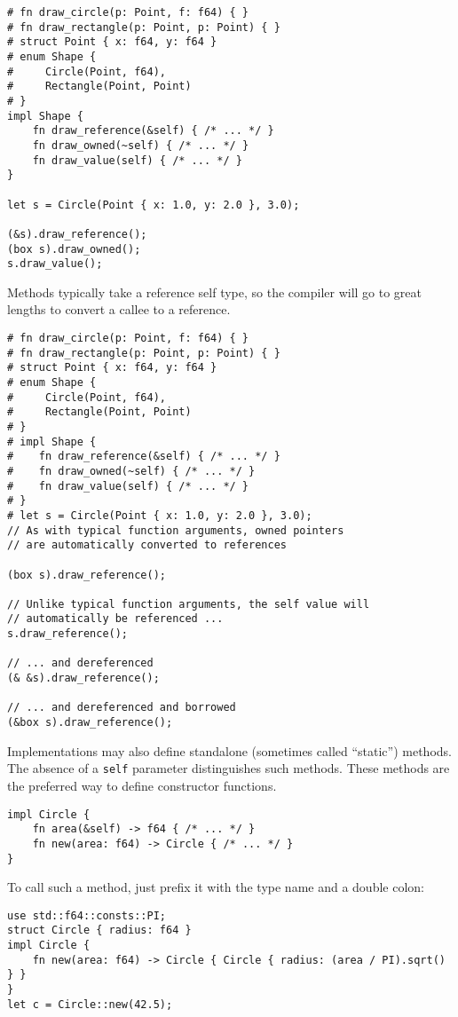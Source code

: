 \documentclass[]{article}
\begin{document}
\begin{verbatim}
# fn draw_circle(p: Point, f: f64) { }
# fn draw_rectangle(p: Point, p: Point) { }
# struct Point { x: f64, y: f64 }
# enum Shape {
#     Circle(Point, f64),
#     Rectangle(Point, Point)
# }
impl Shape {
    fn draw_reference(&self) { /* ... */ }
    fn draw_owned(~self) { /* ... */ }
    fn draw_value(self) { /* ... */ }
}

let s = Circle(Point { x: 1.0, y: 2.0 }, 3.0);

(&s).draw_reference();
(box s).draw_owned();
s.draw_value();
\end{verbatim}

Methods typically take a reference self type, so the compiler will go to
great lengths to convert a callee to a reference.

\begin{verbatim}
# fn draw_circle(p: Point, f: f64) { }
# fn draw_rectangle(p: Point, p: Point) { }
# struct Point { x: f64, y: f64 }
# enum Shape {
#     Circle(Point, f64),
#     Rectangle(Point, Point)
# }
# impl Shape {
#    fn draw_reference(&self) { /* ... */ }
#    fn draw_owned(~self) { /* ... */ }
#    fn draw_value(self) { /* ... */ }
# }
# let s = Circle(Point { x: 1.0, y: 2.0 }, 3.0);
// As with typical function arguments, owned pointers
// are automatically converted to references

(box s).draw_reference();

// Unlike typical function arguments, the self value will
// automatically be referenced ...
s.draw_reference();

// ... and dereferenced
(& &s).draw_reference();

// ... and dereferenced and borrowed
(&box s).draw_reference();
\end{verbatim}

Implementations may also define standalone (sometimes called ``static'')
methods. The absence of a \texttt{self} parameter distinguishes such
methods. These methods are the preferred way to define constructor
functions.

\begin{verbatim}
impl Circle {
    fn area(&self) -> f64 { /* ... */ }
    fn new(area: f64) -> Circle { /* ... */ }
}
\end{verbatim}

To call such a method, just prefix it with the type name and a double
colon:

\begin{verbatim}
use std::f64::consts::PI;
struct Circle { radius: f64 }
impl Circle {
    fn new(area: f64) -> Circle { Circle { radius: (area / PI).sqrt() } }
}
let c = Circle::new(42.5);
\end{verbatim}
\end{document}
